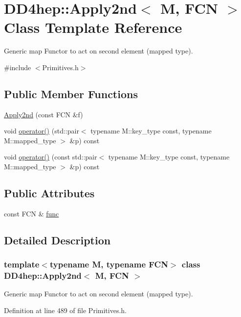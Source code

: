 \hypertarget{class_d_d4hep_1_1_apply2nd}{
\section{DD4hep::Apply2nd$<$ M, FCN $>$ Class Template Reference}
\label{class_d_d4hep_1_1_apply2nd}
}


Generic map Functor to act on second element (mapped type).  


{\ttfamily \#include $<$Primitives.h$>$}\subsection*{Public Member Functions}
\begin{DoxyCompactItemize}
\item 
\hyperlink{class_d_d4hep_1_1_apply2nd_a89cea532d07e73253a2dcb37587d3fd7}{Apply2nd} (const FCN \&f)
\item 
void \hyperlink{class_d_d4hep_1_1_apply2nd_a5ef70adf6c269db5d6a3f8860d388496}{operator()} (std::pair$<$ typename M::key\_\-type const, typename M::mapped\_\-type $>$ \&p) const 
\item 
void \hyperlink{class_d_d4hep_1_1_apply2nd_a87f622f0998bea962d6cf24afc9c52dc}{operator()} (const std::pair$<$ typename M::key\_\-type const, typename M::mapped\_\-type $>$ \&p) const 
\end{DoxyCompactItemize}
\subsection*{Public Attributes}
\begin{DoxyCompactItemize}
\item 
const FCN \& \hyperlink{class_d_d4hep_1_1_apply2nd_aa83e5fb456b913dfe4801fb585b073e0}{func}
\end{DoxyCompactItemize}


\subsection{Detailed Description}
\subsubsection*{template$<$typename M, typename FCN$>$ class DD4hep::Apply2nd$<$ M, FCN $>$}

Generic map Functor to act on second element (mapped type). 

Definition at line 489 of file Primitives.h.

